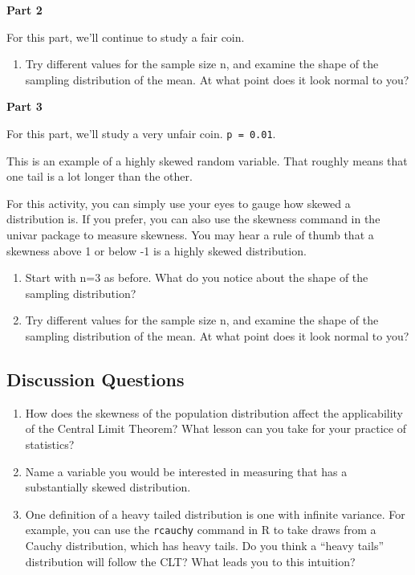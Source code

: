 \documentclass[
]{book}
\providecommand{\tightlist}{%
  \setlength{\itemsep}{0pt}\setlength{\parskip}{0pt}}
\theoremstyle{definition}
\theoremstyle{definition}
\theoremstyle{definition}
\theoremstyle{definition}
\theoremstyle{remark}
\begin{document}
\textbf{Part 2}

For this part, we'll continue to study a fair coin.

\begin{enumerate}
\def\labelenumi{\arabic{enumi}.}
\setcounter{enumi}{4}
\tightlist
\item
  Try different values for the sample size n, and examine the shape of the sampling distribution of the mean. At what point does it look normal to you?
\end{enumerate}

\textbf{Part 3}

For this part, we'll study a very unfair coin. \texttt{p\ =\ 0.01}.

This is an example of a highly skewed random variable. That roughly means that one tail is a lot longer than the other.

For this activity, you can simply use your eyes to gauge how skewed a distribution is. If you prefer, you can also use the skewness command in the univar package to measure skewness. You may hear a rule of thumb that a skewness above 1 or below -1 is a highly skewed distribution.

\begin{enumerate}
\def\labelenumi{\arabic{enumi}.}
\setcounter{enumi}{5}
\item
  Start with n=3 as before. What do you notice about the shape of the sampling distribution?
\item
  Try different values for the sample size n, and examine the shape of the sampling distribution of the mean. At what point does it look normal to you?
\end{enumerate}

\hypertarget{discussion-questions}{%
\subsection{Discussion Questions}\label{discussion-questions}}

\begin{enumerate}
\def\labelenumi{\arabic{enumi}.}
\item
  How does the skewness of the population distribution affect the applicability of the Central Limit Theorem? What lesson can you take for your practice of statistics?
\item
  Name a variable you would be interested in measuring that has a substantially skewed distribution.
\item
  One definition of a heavy tailed distribution is one with infinite variance. For example, you can use the \texttt{rcauchy} command in R to take draws from a Cauchy distribution, which has heavy tails. Do you think a ``heavy tails'' distribution will follow the CLT? What leads you to this intuition?
\end{enumerate}
\end{document}
